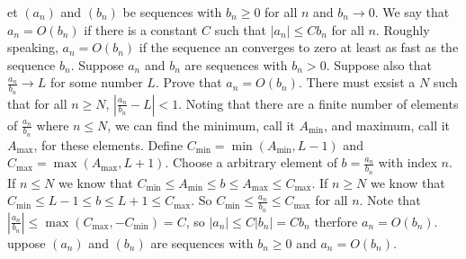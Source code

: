 \documentclass[12pt]{article}
\makeatletter
\theoremstyle{homework}
\newenvironment{exercise}[1]
{\def\@currentlabel{#1}\exercisecore}
{\endexercisecore}
\makeatother
\begin{document}
\begin{exercise}

Let $(a_n)$ and $(b_n)$ be sequences with $b_n \geq 0$ for all $n$ and $b_n\rightarrow 0$. We say that $a_n = O(b_n)$ if there is a constant $C$ such that $|a_n| \leq Cb_n$ for all $n$.  Roughly speaking, $a_n = O(b_n)$ if the sequence an converges to zero at least as fast as the sequence $b_n$.  Suppose $a_n$ and $b_n$ are sequences with $b_n > 0$. Suppose also that $\frac{a_n}{b_n}\rightarrow L$ for some number $L$. Prove that $a_n = O(b_n)$.
\end{exercise}
There must exsist a $N$ such that for all $n\geq N$, $|\frac{a_n}{b_n}-L|<1$.  Noting that there are a finite number of elements of $\frac{a_n}{b_n}$ where $n\leq N$, we can find the minimum, call it $A_{\min}$, and maximum, call it $A_{\max}$, for these elements.  Define $C_{\min}=\min(A_{\min},L-1)$ and $C_{\max}=\max(A_{\max},L+1)$.  Choose a arbitrary element of $b=\frac{a_n}{b_n}$ with index $n$.  If $n\leq N$ we know that $C_{\min} \leq A_{\min}\leq b\leq A_{\max}\leq C_{\max}$.  If $n\geq N$ we know that $C_{\min} \leq L-1 \leq b\leq L+1 \leq C_{\max}$.  So $C_{\min} \leq \frac{a_n}{b_n} \leq C_{\max}$ for all $n$.  Note that $|\frac{a_n}{b_n}| \leq \max(C_{\max},-C_{\min})=C$, so $|a_n|\leq C|b_n|=Cb_n$ therfore $a_n = O(b_n)$.
\begin{exercise}

Suppose $(a_n)$ and $(b_n)$ are sequences with $b_n \geq 0$ and $a_n = O(b_n)$.
\end{exercise}
\end{document}
